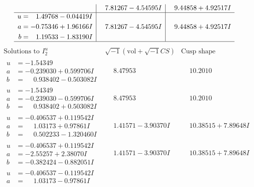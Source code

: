 \documentclass[1p]{elsarticle_modified}
\theoremstyle{definition}
\newcommand{\I}{\sqrt{-1}}
\begin{document}
$$\begin{array}{c|c|c}
 & \phantom{-}7.81267 - 4.54595 I & \phantom{-}9.44858 + 4.92517 I \\ \hline\begin{aligned}
u &= \phantom{-}1.49768 - 0.04419 I \\
a &= -0.75346 + 1.96166 I \\
b &= \phantom{-}1.19533 - 1.83190 I\end{aligned}
 & \phantom{-}7.81267 - 4.54595 I & \phantom{-}9.44858 + 4.92517 I\\
 \hline 
 \end{array}$$\newpage$$\begin{array}{c|c|c}  
\text{Solutions to }I^u_{2}& \I (\text{vol} + \sqrt{-1}CS) & \text{Cusp shape}\\
 \hline 
\begin{aligned}
u &= -1.54349\phantom{ +0.000000I} \\
a &= -0.239030 + 0.599706 I \\
b &= \phantom{-}0.938402 - 0.503082 I\end{aligned}
 & \phantom{-}8.47953\phantom{ +0.000000I} & \phantom{-}10.2010\phantom{ +0.000000I} \\ \hline\begin{aligned}
u &= -1.54349\phantom{ +0.000000I} \\
a &= -0.239030 - 0.599706 I \\
b &= \phantom{-}0.938402 + 0.503082 I\end{aligned}
 & \phantom{-}8.47953\phantom{ +0.000000I} & \phantom{-}10.2010\phantom{ +0.000000I} \\ \hline\begin{aligned}
u &= -0.406537 + 0.119542 I \\
a &= \phantom{-}1.03173 + 0.97861 I \\
b &= \phantom{-}0.502233 - 1.320460 I\end{aligned}
 & \phantom{-}1.41571 - 3.90370 I & \phantom{-}10.38515 + 7.89648 I \\ \hline\begin{aligned}
u &= -0.406537 + 0.119542 I \\
a &= -2.55257 + 2.38070 I \\
b &= -0.382424 - 0.882051 I\end{aligned}
 & \phantom{-}1.41571 - 3.90370 I & \phantom{-}10.38515 + 7.89648 I \\ \hline\begin{aligned}
u &= -0.406537 - 0.119542 I \\
a &= \phantom{-}1.03173 - 0.97861 I \\

\end{aligned}
\end{array}$$
\end{document}
